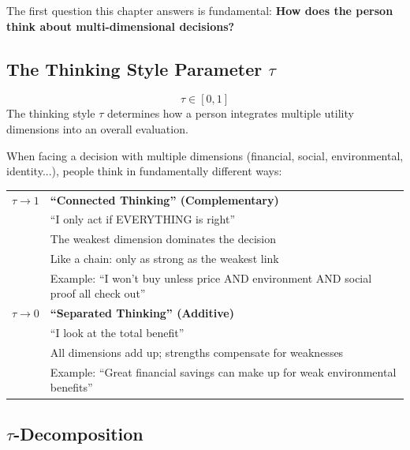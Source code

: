 The first question this chapter answers is fundamental:
\textbf{How does the person think about multi-dimensional decisions?}

\subsection{The Thinking Style Parameter $\tau$}

\begin{definition}
\begin{equation}
\tau \in [0, 1]
\label{eq:tau-range}
\end{equation}
The thinking style $\tau$ determines how a person integrates multiple
utility dimensions into an overall evaluation.
\end{definition}

\begin{intuition}
When facing a decision with multiple dimensions (financial, social, environmental,
identity...), people think in fundamentally different ways:

\begin{center}
\begin{tabular}{cp{10cm}}
\toprule
$\tau \to 1$ & \textbf{``Connected Thinking'' (Complementary)}\\
& ``I only act if EVERYTHING is right''\\
& The weakest dimension dominates the decision\\
& Like a chain: only as strong as the weakest link\\
& Example: ``I won't buy unless price AND environment AND social proof all check out''\\[8pt]

$\tau \to 0$ & \textbf{``Separated Thinking'' (Additive)}\\
& ``I look at the total benefit''\\
& All dimensions add up; strengths compensate for weaknesses\\
& Example: ``Great financial savings can make up for weak environmental benefits''\\
\bottomrule
\end{tabular}
\end{center}
\end{intuition}

\subsection{$\tau$-Decomposition}

